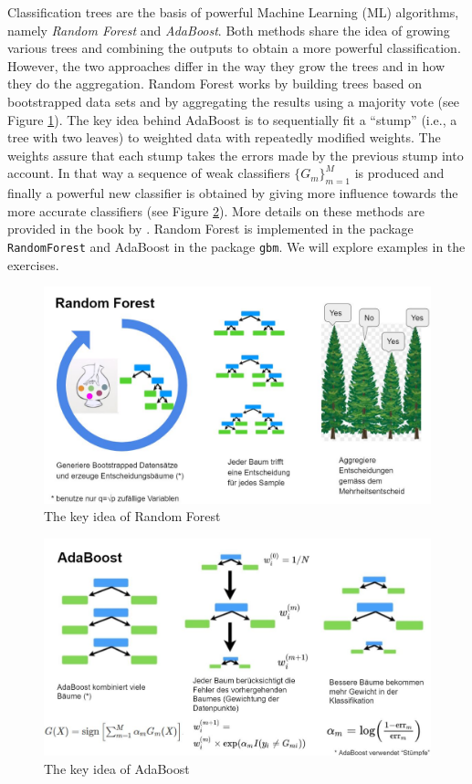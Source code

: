 \documentclass[
]{book}
\begin{document}
Classification trees are the basis of powerful Machine Learning (ML) algorithms, namely \emph{Random Forest} and \emph{AdaBoost}. Both methods share the idea of growing various trees and combining the outputs to obtain a more powerful classification. However, the two approaches differ in the way they grow the trees and in how they do the aggregation. Random Forest works by building trees based on bootstrapped data sets and by aggregating the results using a majority vote (see Figure \ref{fig:randomforest}). The key idea behind AdaBoost is to sequentially fit a ``stump'' (i.e., a tree with two leaves) to weighted data with repeatedly modified weights. The weights assure that each stump takes the errors made by the previous stump into account. In that way a sequence of weak classifiers \(\{G_m\}_{m=1}^M\) is produced and finally a powerful new classifier is obtained by giving more influence towards the more accurate classifiers (see Figure \ref{fig:adaboost}). More details on these methods are provided in the book by \citet{elements}. Random Forest is implemented in the package \texttt{RandomForest} and AdaBoost in the package \texttt{gbm}. We will explore examples in the exercises.

\begin{figure}

{\centering \includegraphics[width=0.8\linewidth]{randomforest} 

}

\caption{The key idea of Random Forest}\label{fig:randomforest}
\end{figure}

\begin{figure}

{\centering \includegraphics[width=0.8\linewidth]{adaboost} 

}

\caption{The key idea of AdaBoost}\label{fig:adaboost}
\end{figure}
\end{document}
